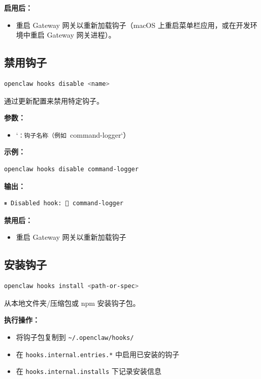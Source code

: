 \textbf{启用后：}

\begin{itemize}
  \item 重启 Gateway 网关以重新加载钩子（macOS 上重启菜单栏应用，或在开发环境中重启 Gateway 网关进程）。
\end{itemize}


\subsection{禁用钩子}


\begin{lstlisting}[language=bash]
openclaw hooks disable <name>
\end{lstlisting}


通过更新配置来禁用特定钩子。

\textbf{参数：}

\begin{itemize}
  \item `\texttt{：钩子名称（例如 }command-logger`）
\end{itemize}


\textbf{示例：}

\begin{lstlisting}[language=bash]
openclaw hooks disable command-logger
\end{lstlisting}


\textbf{输出：}

\begin{lstlisting}
⏸ Disabled hook: 📝 command-logger
\end{lstlisting}


\textbf{禁用后：}

\begin{itemize}
  \item 重启 Gateway 网关以重新加载钩子
\end{itemize}


\subsection{安装钩子}


\begin{lstlisting}[language=bash]
openclaw hooks install <path-or-spec>
\end{lstlisting}


从本地文件夹/压缩包或 npm 安装钩子包。

\textbf{执行操作：}

\begin{itemize}
  \item 将钩子包复制到 \texttt{\textasciitilde{}/.openclaw/hooks/}
  \item 在 \texttt{hooks.internal.entries.*} 中启用已安装的钩子
  \item 在 \texttt{hooks.internal.installs} 下记录安装信息
\end{itemize}


